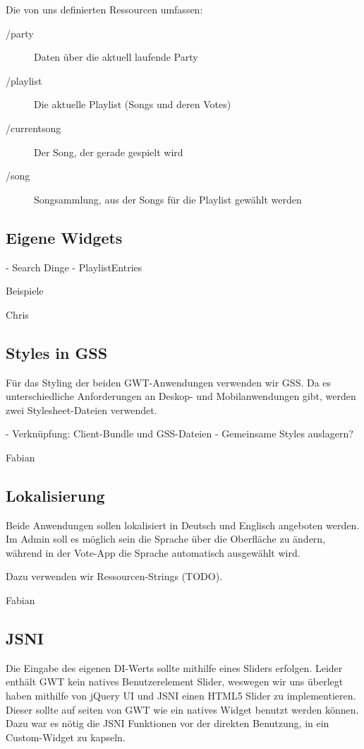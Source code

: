 Die von uns definierten Ressourcen umfassen:
\begin{description}
	\item[/party] Daten über die aktuell laufende Party
	\item[/playlist] Die aktuelle Playlist (Songs und deren Votes)
	\item[/currentsong] Der Song, der gerade gespielt wird
	\item[/song] Songsammlung, aus der Songs für die Playlist gewählt werden
\end{description}

\subsection{Eigene Widgets}
- Search Dinge
- PlaylistEntries

Beispiele

Chris

\subsection{Styles in GSS}
Für das Styling der beiden GWT-Anwendungen verwenden wir GSS. Da es unterschiedliche Anforderungen
an Deskop- und Mobilanwendungen gibt, werden zwei Stylesheet-Dateien verwendet.

- Verknüpfung: Client-Bundle und GSS-Dateien
- Gemeinsame Styles auslagern?

Fabian

\subsection{Lokalisierung}
Beide Anwendungen sollen lokalisiert in Deutsch und Englisch angeboten werden.
Im Admin soll es möglich sein die Sprache über die Oberfläche zu ändern, während
in der Vote-App die Sprache automatisch ausgewählt wird.

Dazu verwenden wir Ressourcen-Strings (TODO).

Fabian

\subsection{JSNI}
Die Eingabe des eigenen DI-Werts sollte mithilfe eines Sliders erfolgen. Leider enthält GWT kein natives Benutzerelement Slider, weswegen wir uns überlegt haben mithilfe von jQuery UI und JSNI einen HTML5 Slider zu implementieren. Dieser sollte auf seiten von GWT wie ein natives Widget benutzt werden können. Dazu war es nötig die JSNI Funktionen vor der direkten Benutzung, in ein Custom-Widget zu kapseln. 

